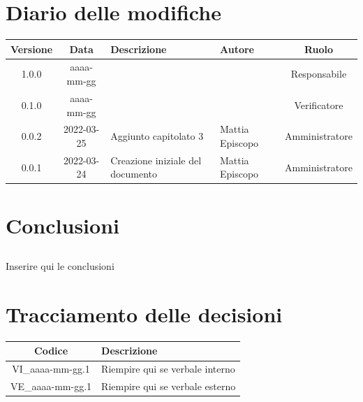 \documentclass[12pt, a4paper,table]{article}
\begin{document}
	\section*{Diario delle modifiche}
	\begin{center}
	\renewcommand{\arraystretch}{1.8} %
	\begin{tabular}{ |c|c|m{12em}|m{7em}|c| }
	\hline
	\textbf{Versione} & \textbf{Data} & \textbf{Descrizione} &  \textbf{Autore} &  \textbf{Ruolo} \\
	\hline
	1.0.0 & aaaa-mm-gg &  & \docApprovazione & Responsabile\\ %
	\hline
	0.1.0 & aaaa-mm-gg &  & \docVerificatori & Verificatore\\ %
	\hline
    	0.0.2 & 2022-03-25 & Aggiunto capitolato 3 & Mattia \newline Episcopo & Amministratore\\  %
    	0.0.1 & 2022-03-24 & Creazione iniziale del documento & Mattia \newline Episcopo & Amministratore\\  %
	\hline
	\end{tabular}
	\end{center}
	\newpage
	
	\tableofcontents
	\newpage
	
	\newpage
	\newpage
		
	\newpage
	\newpage
	\section{Conclusioni}
	    \subsection {} Inserire qui le conclusioni
	\newpage
	
	\section*{Tracciamento delle decisioni}
	\renewcommand{\arraystretch}{1.8} %
	\begin{tabular}{ |c|l| }
		\hline
		\textbf{Codice} & \textbf{Descrizione} \\
		\hline
		VI\_aaaa-mm-gg.1 & Riempire qui se verbale interno\\ \hline
		VE\_aaaa-mm-gg.1 & Riempire qui se verbale esterno\\ \hline
	\end{tabular}
\end{document}
